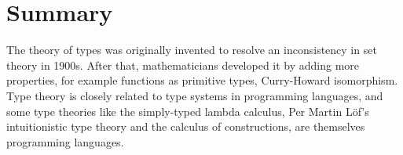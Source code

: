 






\section{Summary}


The theory of types was originally invented to resolve an inconsistency in set theory in 1900s. After that, mathematicians developed it by adding more properties, for example functions as primitive types, Curry-Howard isomorphism. Type theory is closely related to type systems in programming languages, and some type theories like the simply-typed lambda calculus, Per Martin L\"{o}f's intuitionistic type theory and the calculus of constructions, are themselves programming languages. 

